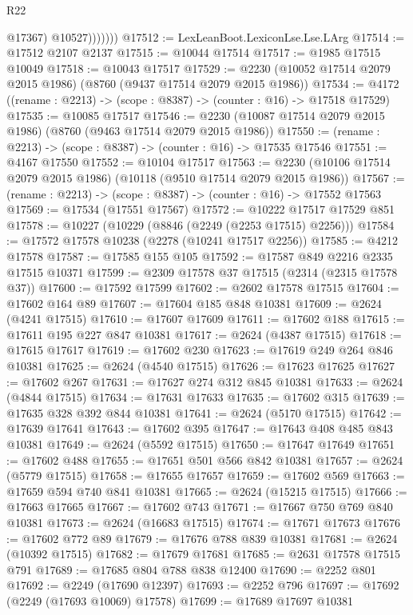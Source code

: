 \begin{lexlean}{R22}
\begin{coremodule}
                    @17367)
                  @10527)))))))
@17512 := LexLeanBoot.LexiconLse.Lse.LArg
@17514 := @17512 @2107 @2137
@17515 := @10044 @17514
@17517 := @1985 @17515 @10049
@17518 := @10043 @17517
@17529 := @2230 (@10052 @17514 @2079 @2015 @1986) (@8760 (@9437 @17514 @2079 @2015 @1986))
@17534 := @4172 ((rename : @2213) -> (scope : @8387) -> (counter : @16) -> @17518 @17529)
@17535 := @10085 @17517
@17546 := @2230 (@10087 @17514 @2079 @2015 @1986) (@8760 (@9463 @17514 @2079 @2015 @1986))
@17550 := (rename : @2213) -> (scope : @8387) -> (counter : @16) -> @17535 @17546
@17551 := @4167 @17550
@17552 := @10104 @17517
@17563 := @2230 (@10106 @17514 @2079 @2015 @1986) (@10118 (@9510 @17514 @2079 @2015 @1986))
@17567 := (rename : @2213) -> (scope : @8387) -> (counter : @16) -> @17552 @17563
@17569 := @17534 (@17551 @17567)
@17572 := @10222 @17517 @17529 @851
@17578 := @10227 (@10229 (@8846 (@2249 (@2253 @17515) @2256)))
@17584 := @17572 @17578 @10238 (@2278 (@10241 @17517 @2256))
@17585 := @4212 @17578
@17587 := @17585 @155 @105
@17592 := @17587 @849 @2216 @2335 @17515 @10371
@17599 := @2309 @17578 @37 @17515 (@2314 (@2315 @17578 @37))
@17600 := @17592 @17599
@17602 := @2602 @17578 @17515
@17604 := @17602 @164 @89
@17607 := @17604 @185 @848 @10381
@17609 := @2624 (@4241 @17515)
@17610 := @17607 @17609
@17611 := @17602 @188
@17615 := @17611 @195 @227 @847 @10381
@17617 := @2624 (@4387 @17515)
@17618 := @17615 @17617
@17619 := @17602 @230
@17623 := @17619 @249 @264 @846 @10381
@17625 := @2624 (@4540 @17515)
@17626 := @17623 @17625
@17627 := @17602 @267
@17631 := @17627 @274 @312 @845 @10381
@17633 := @2624 (@4844 @17515)
@17634 := @17631 @17633
@17635 := @17602 @315
@17639 := @17635 @328 @392 @844 @10381
@17641 := @2624 (@5170 @17515)
@17642 := @17639 @17641
@17643 := @17602 @395
@17647 := @17643 @408 @485 @843 @10381
@17649 := @2624 (@5592 @17515)
@17650 := @17647 @17649
@17651 := @17602 @488
@17655 := @17651 @501 @566 @842 @10381
@17657 := @2624 (@5779 @17515)
@17658 := @17655 @17657
@17659 := @17602 @569
@17663 := @17659 @594 @740 @841 @10381
@17665 := @2624 (@15215 @17515)
@17666 := @17663 @17665
@17667 := @17602 @743
@17671 := @17667 @750 @769 @840 @10381
@17673 := @2624 (@16683 @17515)
@17674 := @17671 @17673
@17676 := @17602 @772 @89
@17679 := @17676 @788 @839 @10381
@17681 := @2624 (@10392 @17515)
@17682 := @17679 @17681
@17685 := @2631 @17578 @17515 @791
@17689 := @17685 @804 @788 @838 @12400
@17690 := @2252 @801
@17692 := @2249 (@17690 @12397)
@17693 := @2252 @796
@17697 := @17692 (@2249 (@17693 @10069) @17578)
@17699 := @17689 @17697 @10381

\end{coremodule}
\end{lexlean}
